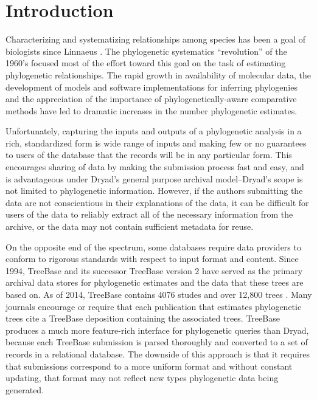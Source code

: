 \documentclass{bioinfo}
\begin{document}
\section{Introduction}

Characterizing and systematizing relationships among species has been a goal of biologists since Linnaeus \cite{Linne1758}.
The phylogenetic systematics ``revolution'' of the 1960's focused most of the effort toward this goal on the 
    task of estimating phylogenetic relationships.
The rapid growth in availability of molecular data, the development of models and software implementations for
    inferring phylogenies and the appreciation of the importance of phylogenetically-aware comparative methods
    \citep[e.g.][]{Felsenstein1985Comp} have led to dramatic increases in the number phylogenetic estimates.


Unfortunately, capturing the inputs and outputs of a phylogenetic analysis in a rich, standardized form is
    wide range of inputs and making few or no
    guarantees to users of the database that the records will be in any particular form.
This encourages sharing of data by making the submission process fast and easy, and is advantageous under Dryad's
    general purpose archival model--Dryad's scope is not limited to phylogenetic information.
However, if the authors submitting the data are not conscientious in their explanations of the data, it can be difficult
    for users of the data to reliably extract all of the necessary information from the archive, or the data may not contain sufficient metadata for reuse.

On the opposite end of the spectrum, some databases require data providers to conform to rigorous
    standards with respect to input format and content.
Since 1994, TreeBase \citep{SandersonDPE1994} and its successor TreeBase version 2 \citep{TreeBase2} have served
    as the primary archival data stores for phylogenetic estimates and the data that these trees are based on.
As of 2014, TreeBase contains 4076 studes and over 12,800 trees \citep{TreeBaseWebCite}.
Many journals encourage or require that each publication that estimates phylogenetic trees cite a TreeBase
    deposition containing the associated trees.
TreeBase produces a much more feature-rich interface for phylogenetic queries than Dryad, because each 
    TreeBase submission is parsed thoroughly and converted to a set of records in a relational database.
The downside of this approach is that it requires that submissions correspond to a more uniform format and without constant updating,
    that format may not reflect new types phylogenetic data being generated.
\end{document}
